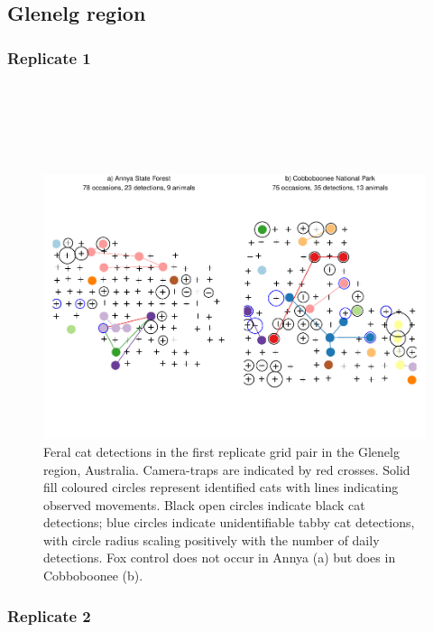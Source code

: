 \documentclass[11pt,a4paper,titlepage,twoside,openright]{style/unimelbthesis}
\begin{document}
\begin{mainmatter}
\hypertarget{glenelg-region-3}{%
\subsection{Glenelg region}\label{glenelg-region-3}}

\hypertarget{replicate-1}{%
\subsubsection{Replicate 1}\label{replicate-1}}

\(~\)

\(~\)

\(~\)
\begin{figure}

{\centering \includegraphics[width=1\linewidth]{figure/density-plot-ch-1-1} 

}

\caption{Feral cat detections in the first replicate grid pair in the Glenelg region, Australia. Camera-traps are indicated by red crosses. Solid fill coloured circles represent identified cats with lines indicating observed movements. Black open circles indicate black cat detections; blue circles indicate unidentifiable tabby cat detections, with circle radius scaling positively with the number of daily detections. Fox control does not occur in Annya (a) but does in Cobboboonee (b).}\label{fig:density-plot-ch-1}
\end{figure}
\newpage

\hypertarget{replicate-2}{%
\subsubsection{Replicate 2}\label{replicate-2}}


\end{mainmatter}
\end{document}
